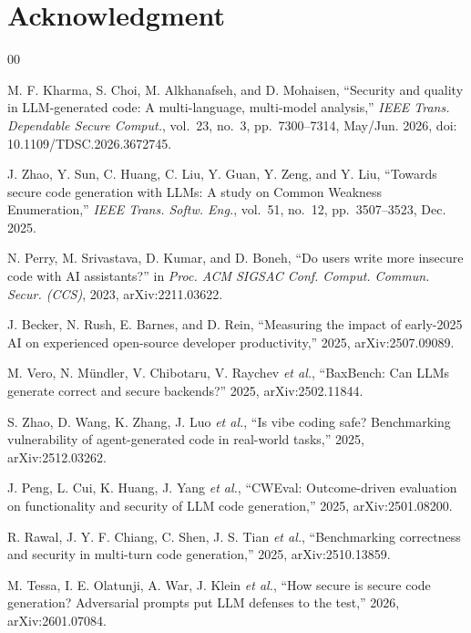 \documentclass[conference]{IEEEtran}
\begin{document}
\section*{Acknowledgment}

\begin{thebibliography}{00}

 M. F. Kharma, S. Choi, M. Alkhanafseh, and D. Mohaisen,
``Security and quality in LLM-generated code: A multi-language, multi-model
analysis,'' \textit{IEEE Trans. Dependable Secure Comput.}, vol.~23, no.~3,
pp.~7300--7314, May/Jun. 2026, doi: 10.1109/TDSC.2026.3672745.

 J. Zhao, Y. Sun, C. Huang, C. Liu, Y. Guan, Y. Zeng,
and Y. Liu, ``Towards secure code generation with LLMs: A study on Common
Weakness Enumeration,'' \textit{IEEE Trans. Softw. Eng.}, vol.~51, no.~12,
pp.~3507--3523, Dec. 2025.

 N. Perry, M. Srivastava, D. Kumar, and D. Boneh, ``Do users
write more insecure code with AI assistants?'' in \textit{Proc. ACM SIGSAC Conf.
Comput. Commun. Secur. (CCS)}, 2023, arXiv:2211.03622.

 J. Becker, N. Rush, E. Barnes, and D. Rein, ``Measuring the
impact of early-2025 AI on experienced open-source developer productivity,''
2025, arXiv:2507.09089.

 M. Vero, N. M\"undler, V. Chibotaru, V. Raychev
\textit{et al.}, ``BaxBench: Can LLMs generate correct and secure backends?''
2025, arXiv:2502.11844.

 S. Zhao, D. Wang, K. Zhang, J. Luo \textit{et al.}, ``Is
vibe coding safe? Benchmarking vulnerability of agent-generated code in
real-world tasks,'' 2025, arXiv:2512.03262.

 J. Peng, L. Cui, K. Huang, J. Yang \textit{et al.},
``CWEval: Outcome-driven evaluation on functionality and security of LLM code
generation,'' 2025, arXiv:2501.08200.

 R. Rawal, J. Y. F. Chiang, C. Shen, J. S. Tian \textit{et
al.}, ``Benchmarking correctness and security in multi-turn code generation,''
2025, arXiv:2510.13859.

 M. Tessa, I. E. Olatunji, A. War, J. Klein \textit{et al.},
``How secure is secure code generation? Adversarial prompts put LLM defenses to
the test,'' 2026, arXiv:2601.07084.


\end{thebibliography}
\end{document}
